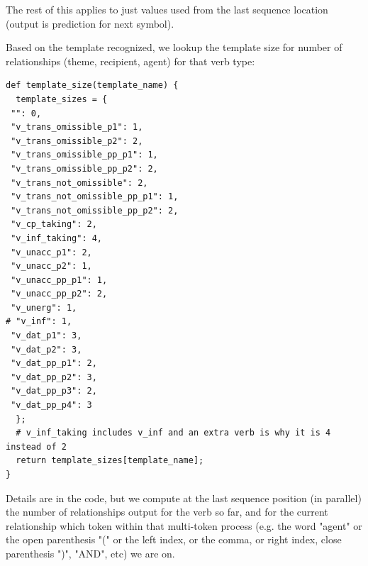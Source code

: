 \documentclass[11pt]{article}
\begin{document}
The rest of this applies to just values used from the last sequence location (output is prediction for next symbol).

Based on the template recognized, we lookup the template size for number of relationships (theme, recipient, agent) for that verb type:
\begin{tiny}
\begin{verbatim}
def template_size(template_name) {
  template_sizes = {
 "": 0,
 "v_trans_omissible_p1": 1,
 "v_trans_omissible_p2": 2,
 "v_trans_omissible_pp_p1": 1,
 "v_trans_omissible_pp_p2": 2,
 "v_trans_not_omissible": 2,
 "v_trans_not_omissible_pp_p1": 1,
 "v_trans_not_omissible_pp_p2": 2,
 "v_cp_taking": 2,
 "v_inf_taking": 4,
 "v_unacc_p1": 2,
 "v_unacc_p2": 1,
 "v_unacc_pp_p1": 1,
 "v_unacc_pp_p2": 2,
 "v_unerg": 1,
# "v_inf": 1,
 "v_dat_p1": 3,
 "v_dat_p2": 3,
 "v_dat_pp_p1": 2,
 "v_dat_pp_p2": 3,
 "v_dat_pp_p3": 2,
 "v_dat_pp_p4": 3 
  };
  # v_inf_taking includes v_inf and an extra verb is why it is 4 instead of 2
  return template_sizes[template_name];
}
\end{verbatim}
\end{tiny}

Details are in the code, but we compute at the last sequence position (in parallel) the number of relationships output for the verb so far, and for the current relationship which token within that multi-token process (e.g. the word "agent" or the open parenthesis "(" or the left index, or the comma, or right index, close parenthesis ")", "AND", etc) we are on.
\end{document}
